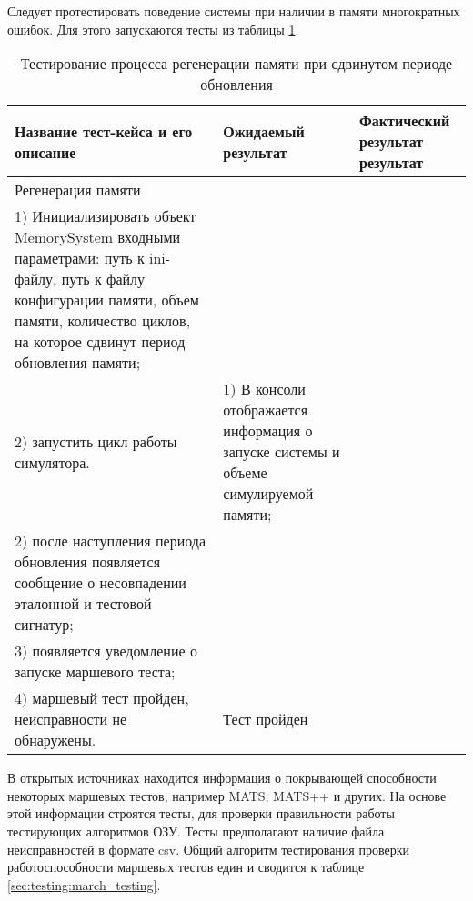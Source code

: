 Следует протестировать поведение системы при наличии в памяти многократных ошибок. Для этого запускаются тесты из таблицы \ref{sec:testing:regeneration}.
\begin{longtable}[p]{| >{\raggedright}p{}                     
                     | >{\raggedright}p{}
                     | >{\raggedright\arraybackslash}p{}|}
  \caption{Тестирование процесса регенерации  памяти при сдвинутом периоде обновления}
  \label{sec:testing:regeneration} \tabularnewline

  \hline
      Название тест-кейса и его описание & Ожидаемый результат & Фактический результат результат \\
   \hline
   Регенерация памяти\\ 
   1) Инициализировать объект MemorySystem входными параметрами: путь к ini-файлу, путь к файлу конфигурации памяти, объем памяти, количество циклов, на которое сдвинут период обновления памяти; \\
   2) запустить цикл работы симулятора.

   &
   1) В консоли отображается информация о запуске системы и объеме симулируемой памяти;\\
   2) после наступления периода обновления появляется сообщение о несовпадении эталонной и тестовой сигнатур;\\
   3) появляется уведомление о запуске маршевого теста;\\
   4) маршевый тест пройден, неисправности не обнаружены.

   &
   Тест пройден \\
   \hline
\end{longtable}

В открытых источниках находится информация о покрывающей способности некоторых маршевых тестов, например MATS, MATS++ и других. На основе этой информации строятся тесты, для проверки правильности работы тестирующих алгоритмов ОЗУ. Тесты предполагают наличие файла неисправностей в формате csv. Общий алгоритм тестирования проверки работоспособности маршевых тестов един и сводится к таблице \ref{sec:testing:march_testing}.
\pagebreak

